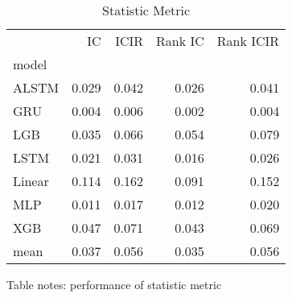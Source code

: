 \documentclass[10pt,letterpaper]{article}
\begin{document}
\subsubsection*{}

\begin{table}[!ht]
\begin{adjustwidth}{-2.25in}{0in} %
\centering
\caption{Statistic Metric}
\begin{tabular}{lrrrr}
\toprule
{} &     IC &   ICIR &  Rank IC &  Rank ICIR \\
model  &        &        &          &            \\
\midrule
ALSTM  &  0.029 &  0.042 &    0.026 &      0.041 \\
GRU    &  0.004 &  0.006 &    0.002 &      0.004 \\
LGB    &  0.035 &  0.066 &    0.054 &      0.079 \\
LSTM   &  0.021 &  0.031 &    0.016 &      0.026 \\
Linear &  0.114 &  0.162 &    0.091 &      0.152 \\
MLP    &  0.011 &  0.017 &    0.012 &      0.020 \\
XGB    &  0.047 &  0.071 &    0.043 &      0.069 \\
mean   &  0.037 &  0.056 &    0.035 &      0.056 \\
\bottomrule
\end{tabular}




\begin{flushleft}
Table notes: performance of statistic metric
\end{flushleft}
\label{table1}
\end{adjustwidth}

\end{table}
\end{document}
